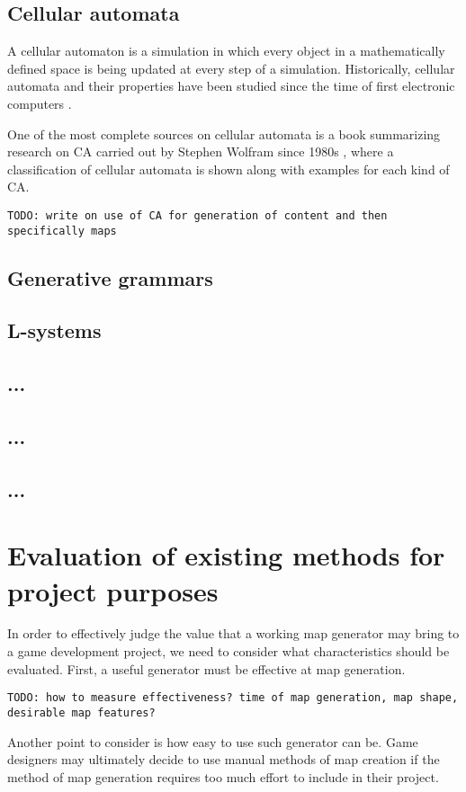 \documentclass[12pt]{report}
\newcommand{\todo}[1]{}
\renewcommand{\todo}[1]{{\color{red} \par \noindent \footnotesize \texttt{TODO: {#1} }}}
\begin{document}
\subsection{Cellular automata}

A cellular automaton is a simulation in which every object in a mathematically defined space is being updated at every step of a simulation. Historically, cellular automata and their properties have been studied since the time of first electronic computers \autocite{Sarkar:2000:BHC:349194.349202}.

One of the most complete sources on cellular automata is a book summarizing research on CA carried out by Stephen Wolfram since 1980s \autocite{wolfram2002new}, where a classification of cellular automata is shown along with examples for each kind of CA. 

\todo{write on use of CA for generation of content and then specifically maps }


\subsection{Generative grammars}
\subsection{L-systems}
\subsection{...}
\subsection{...}
\subsection{...}
\section{Evaluation of existing methods for project purposes}

In order to effectively judge the value that a working map generator may bring to a game development project, we need to consider what characteristics should be evaluated. First, a useful generator must be effective at map generation.

\todo{how to measure effectiveness? time of map generation, map shape, desirable map features?}

Another point to consider is how easy to use such generator can be. Game designers may ultimately decide to use manual methods of map creation if the method of map generation requires too much effort to include in their project.
\end{document}
